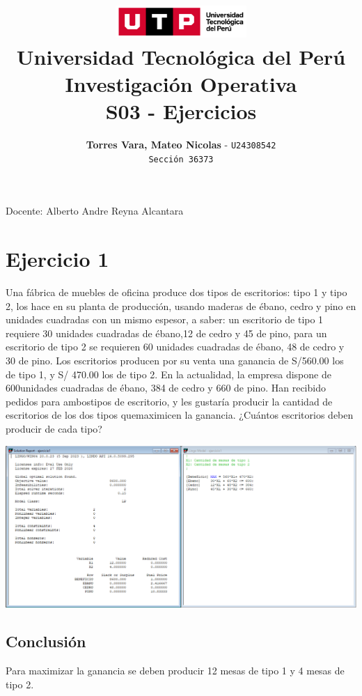 \documentclass[12pt]{article}
\title{
  \vspace{2cm}
  \pagenumbering{gobble}
  \includegraphics[width=5cm]{../assets/logo-utp.png} \\
  \vspace{1cm}
  \textbf{Universidad Tecnológica del Perú} \\
  \vspace{2cm}
  \textbf{Investigación Operativa} \\
  \vspace{1cm}
  \large \textbf{S03 - Ejercicios}
}
\author{
  \textbf{Torres Vara, Mateo Nicolas} - \texttt{U24308542} \\
  \texttt{Sección 36373}
}
\begin{document}
\maketitle
\begin{center}

  Docente: Alberto Andre Reyna Alcantara

\end{center}

%
%

\newpage
\section*{Ejercicio 1}
\noindent Una fábrica de muebles de oficina produce dos tipos de escritorios: tipo 1 y tipo 2, los hace en su planta de producción, usando maderas de ébano, cedro y pino en unidades cuadradas con un mismo espesor, a saber: un escritorio de tipo 1 requiere 30 unidades cuadradas de ébano,12 de cedro y 45 de pino, para un escritorio de tipo 2 se requieren 60 unidades cuadradas de ébano, 48 de cedro y 30 de pino. Los escritorios producen por su venta una ganancia de S/560.00 los de tipo 1, y S/ 470.00 los de tipo 2. En la actualidad, la empresa dispone de 600unidades cuadradas de ébano, 384 de cedro y 660 de pino. Han recibido pedidos para ambostipos de escritorio, y les gustaría producir la cantidad de escritorios de los dos tipos quemaximicen la ganancia. ¿Cuántos escritorios deben producir de cada tipo? \\
\begin{center}
  \includegraphics[width=1\textwidth]{./assets/ejercicio1.PNG}
\end{center}
\subsection*{Conclusión}
\noindent Para maximizar la ganancia se deben producir 12 mesas de tipo 1 y 4 mesas de tipo 2.
\end{document}
